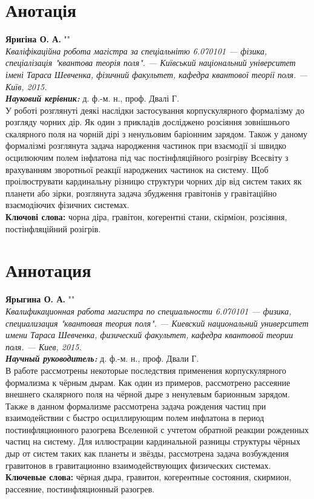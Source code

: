 \newpage

\section*{Анотація}

  {\bf Яригіна О. А.} "\thesistopicUA"\\
  {\itshape Кваліфікаційна робота магістра за спеціальнітю 6.070101 --- фізика, спеціалізація "квантова теорія поля". --- Київський національний університет імені Тараса Шевченка, фізичний факультет, кафедра квантової теорії поля. --- Київ, 2015.\\}
  {\itshape \bfseries Науковий керівник:} д. ф.-м. н., проф. Двалі Г. \\%

  У роботі розглянуті деякі наслідки застосування корпускулярного формалізму до розгляду чорних дір. Як один з прикладів досліджено розсіяння зовнішнього скалярного поля на чорній дірі з ненульовим баріонним зарядом. Також у даному формалізмі розглянута задача народження частинок при взаємодії зі швидко осцилюючим полем інфлатона під час постінфляційного розігріву Всесвіту з врахуванням зворотньої реакції народжених частинок на систему. Щоб проілюструвати кардинальну різницю структури чорних дір від систем таких як планети або зірки, розглянута задача збудження гравітонів у гравітаційно взаємодіючих фізичних системах.
   \\[0.5cm]
  {\bf Ключові слова:} чорна діра, гравітон, когерентні стани, скірміон, розсіяння, постінфляційний розігрів.\\

\section*{Аннотация}

  {\bf Ярыгина О. А.} "\thesistopicRU"\\
  {\itshape Квалификационная работа магистра по специальности 6.070101 --- физика, специализация "квантовая теория поля". --- Киевский национальний университет имени Тараса Шевченка, физический факультет, кафедра квантовой теории поля. --- Киев, 2015.\\}
  {\itshape \bfseries Научный руководитель:}  д. ф.-м. н., проф. Двали Г.\\%

  В работе рассмотрены некоторые последствия применения корпускулярного формализма к чёрным дырам. Как один из примеров, рассмотрено рассеяние внешнего скалярного поля на чёрной дыре з ненулевым барионным зарядом. Также в данном формализме рассмотрена задача рождения частиц при взаимодействии с быстро осциллирующим полем инфлатона в период постинфляционного разогрева Вселенной с учтетом обратной реакции рожденных частиц на систему. Для иллюстрации кардинальной разницы структуры чёрных дыр от систем таких как планеты и звёзды, рассмотрена задача возбуждения гравитонов в гравитационно взаимодействующих физических системах.
   \\[0.5cm]
  {\bf Ключевые слова:} чёрная дыра, гравитон, когерентные состояния, скирмион, рассеяние, постинфляционный разогрев.\\[0.5cm]

